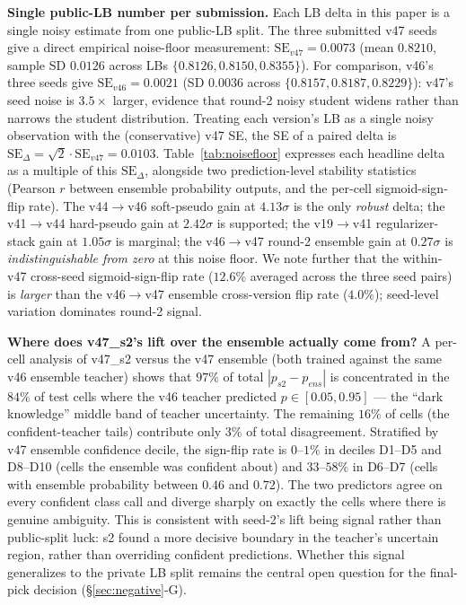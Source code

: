 \documentclass[conference]{IEEEtran}
\begin{document}
\textbf{Single public-LB number per submission.} Each LB delta in this paper is a single noisy estimate from one public-LB split. The three submitted v47 seeds give a direct empirical noise-floor measurement: $\mathrm{SE}_{v47} = 0.0073$ (mean $0.8210$, sample SD $0.0126$ across LBs $\{0.8126, 0.8150, 0.8355\}$). For comparison, v46's three seeds give $\mathrm{SE}_{v46} = 0.0021$ (SD $0.0036$ across $\{0.8157, 0.8187, 0.8229\}$): v47's seed noise is $3.5\times$ larger, evidence that round-2 noisy student widens rather than narrows the student distribution. Treating each version's LB as a single noisy observation with the (conservative) v47 SE, the SE of a paired delta is $\mathrm{SE}_\Delta = \sqrt{2} \cdot \mathrm{SE}_{v47} = 0.0103$. Table~\ref{tab:noisefloor} expresses each headline delta as a multiple of this $\mathrm{SE}_\Delta$, alongside two prediction-level stability statistics (Pearson $r$ between ensemble probability outputs, and the per-cell sigmoid-sign-flip rate). The v44$\rightarrow$v46 soft-pseudo gain at $4.13\sigma$ is the only \emph{robust} delta; the v41$\rightarrow$v44 hard-pseudo gain at $2.42\sigma$ is supported; the v19$\rightarrow$v41 regularizer-stack gain at $1.05\sigma$ is marginal; the v46$\rightarrow$v47 round-2 ensemble gain at $0.27\sigma$ is \emph{indistinguishable from zero} at this noise floor. We note further that the within-v47 cross-seed sigmoid-sign-flip rate ($12.6\%$ averaged across the three seed pairs) is \emph{larger} than the v46$\rightarrow$v47 ensemble cross-version flip rate ($4.0\%$); seed-level variation dominates round-2 signal.

\textbf{Where does v47\_s2's lift over the ensemble actually come from?} A per-cell analysis of v47\_s2 versus the v47 ensemble (both trained against the same v46 ensemble teacher) shows that $97\%$ of total $|p_{s2} - p_{ens}|$ is concentrated in the $84\%$ of test cells where the v46 teacher predicted $p \in [0.05, 0.95]$ --- the ``dark knowledge'' middle band of teacher uncertainty. The remaining $16\%$ of cells (the confident-teacher tails) contribute only $3\%$ of total disagreement. Stratified by v47 ensemble confidence decile, the sign-flip rate is $0$--$1\%$ in deciles D1--D5 and D8--D10 (cells the ensemble was confident about) and $33$--$58\%$ in D6--D7 (cells with ensemble probability between $0.46$ and $0.72$). The two predictors agree on every confident class call and diverge sharply on exactly the cells where there is genuine ambiguity. This is consistent with seed-2's lift being signal rather than public-split luck: s2 found a more decisive boundary in the teacher's uncertain region, rather than overriding confident predictions. Whether this signal generalizes to the private LB split remains the central open question for the final-pick decision (\S\ref{sec:negative}-G).
\end{document}
